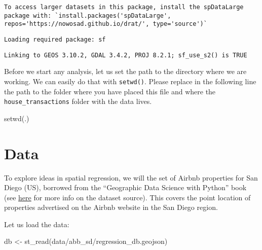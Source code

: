 \documentclass[
  letterpaper,
  krantz2]{style/krantz}
\newenvironment{Shaded}{\begin{snugshade}}{\end{snugshade}}
\newcommand{\FunctionTok}[1]{\textcolor[rgb]{0.28,0.35,0.67}{#1}}
\newcommand{\NormalTok}[1]{\textcolor[rgb]{0.00,0.23,0.31}{#1}}
\newcommand{\OtherTok}[1]{\textcolor[rgb]{0.00,0.23,0.31}{#1}}
\newcommand{\StringTok}[1]{\textcolor[rgb]{0.13,0.47,0.30}{#1}}
\begin{document}
\begin{verbatim}
To access larger datasets in this package, install the spDataLarge
package with: `install.packages('spDataLarge',
repos='https://nowosad.github.io/drat/', type='source')`
\end{verbatim}

\begin{verbatim}
Loading required package: sf
\end{verbatim}

\begin{verbatim}
Linking to GEOS 3.10.2, GDAL 3.4.2, PROJ 8.2.1; sf_use_s2() is TRUE
\end{verbatim}

Before we start any analysis, let us set the path to the directory where
we are working. We can easily do that with \texttt{setwd()}. Please
replace in the following line the path to the folder where you have
placed this file and where the \texttt{house\_transactions} folder with
the data lives.

\begin{Shaded}
\begin{Highlighting}[]
\FunctionTok{setwd}\NormalTok{(}\StringTok{\textquotesingle{}.\textquotesingle{}}\NormalTok{)}
\end{Highlighting}
\end{Shaded}

\hypertarget{data-2}{%
\section{Data}\label{data-2}}

To explore ideas in spatial regression, we will the set of Airbnb
properties for San Diego (US), borrowed from the ``Geographic Data
Science with Python'' book (see
\href{https://geographicdata.science/book/data/airbnb/regression_cleaning.html}{here}
for more info on the dataset source). This covers the point location of
properties advertised on the Airbnb website in the San Diego region.

Let us load the data:

\begin{Shaded}
\begin{Highlighting}[]
\NormalTok{db }\OtherTok{\textless{}{-}} \FunctionTok{st\_read}\NormalTok{(}\StringTok{\textquotesingle{}data/abb\_sd/regression\_db.geojson\textquotesingle{}}\NormalTok{)}
\end{Highlighting}
\end{Shaded}
\end{document}
